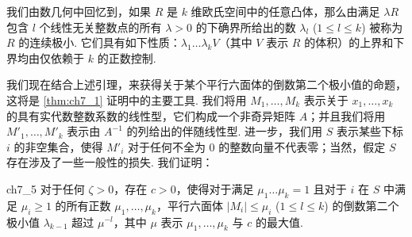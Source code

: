 我们由数几何中回忆到，如果 $R$ 是 $k$ 维欧氏空间中的任意凸体，那么由满足 $\lambda R$ 包含 $l$ 个线性无关整数点的所有 $\lambda > 0$ 的下确界所给出的数 $\lambda_l$ ($1 \le l \le k$) 被称为 $R$ 的连续极小. 它们具有如下性质：$\lambda_1 \dots \lambda_k V$（其中 $V$ 表示 $R$ 的体积）的上界和下界均由仅依赖于 $k$ 的正数控制.

我们现在结合上述引理，来获得关于某个平行六面体的倒数第二个极小值的命题，这将是 \autoref{thm:ch7_1} 证明中的主要工具. 我们将用 $M_1, \ldots, M_k$ 表示关于 $x_1, \ldots, x_k$ 的具有实代数整数系数的线性型，它们构成一个非奇异矩阵 $A$；并且我们将用 $M'_1, \ldots, M'_k$ 表示由 $A^{-1}$ 的列给出的伴随线性型. 进一步，我们用 $S$ 表示某些下标 $i$ 的非空集合，使得 $M'_i$ 对于任何不全为 0 的整数向量不代表零；当然，假定 $S$ 存在涉及了一些一般性的损失. 我们证明：

\begin{mylemma}{}{ch7_5}
对于任何 $\zeta > 0$，存在 $c > 0$，使得对于满足 $\mu_1 \ldots \mu_k = 1$ 且对于 $i$ 在 $S$ 中满足 $\mu_i \ge 1$ 的所有正数 $\mu_1, \ldots, \mu_k$，平行六面体 $|M_i| \le \mu_i$ ($1 \le l \le k$) 的倒数第二个极小值 $\lambda_{k-1}$ 超过 $\mu^{-l}$，其中 $\mu$ 表示 $\mu_1, \ldots, \mu_k$ 与 $c$ 的最大值.
\end{mylemma}

